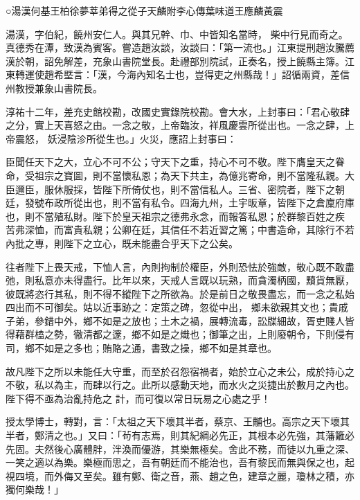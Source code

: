 
\begin{pinyinscope}

 ○湯漢何基王柏徐夢莘弟得之從子天麟附李心傳葉味道王應麟黃震



 湯漢，字伯紀，饒州安仁人。與其兄幹、巾、中皆知名當時，
 柴中行見而奇之。真德秀在潭，致漢為賓客。嘗造趙汝談，汝談曰：「第一流也。」江東提刑趙汝騰薦漢於朝，詔免解差，充象山書院堂長。赴禮部別院試，正奏名，授上饒縣主簿。江東轉運使趙希塈言：「漢，今海內知名士也，豈得吏之州縣哉！」詔循兩資，差信州教授兼象山書院長。



 淳祐十二年，差充史館校勘，改國史實錄院校勘。會大水，上封事曰：「君心敬肆之分，實上天喜怒之由。一念之敬，上帝臨汝，祥風慶雲所從出也。一念之肆，上帝震怒，
 妖浸陰沴所從生也。」火災，應詔上封事曰：



 臣聞任天下之大，立心不可不公；守天下之重，持心不可不敬。陛下膺皇天之眷命，受祖宗之寶圖，則不當懷私恩；為天下共主，為億兆寄命，則不當隆私親。大臣邇臣，服休服採，皆陛下所倚仗也，則不當信私人。三省、密院者，陛下之朝廷，發號布政所從出也，則不當有私令。四海九州，土宇昄章，皆陛下之倉廩府庫也，則不當殖私財。陛下於皇天祖宗之德弗永念，而報答私恩；於群黎百姓之疾
 苦弗深恤，而富貴私親；公卿在廷，其信任不若近習之篤；中書造命，其除行不若內批之專，則陛下之立心，既未能盡合乎天下之公矣。



 往者陛下上畏天戒，下恤人言，內則拘制於權臣，外則恐怯於強敵，敬心既不敢盡弛，則私意亦未得盡行。比年以來，天戒人言既以玩熟，而貪濁柄國，黷貨無厭，彼既將恣行其私，則不得不縱陛下之所欲為。於是前日之敬畏盡忘，而一念之私始四出而不可御矣。姑以近事跡之：定策之碑，忽從中出，
 鄉未欲親其文也；貴戚子弟，參錯中外，鄉不如是之放也；土木之禍，展轉流毒，訟牒細故，胥吏賤人皆得藉群榼之勢，徹清都之邃，鄉不如是之熾也；御筆之出，上則廢朝令，下則侵有司，鄉不如是之多也；賄賂之通，書致之操，鄉不如是其章也。



 故凡陛下之所以未能任大守重，而至於召怨宿禍者，始於立心之未公，成於持心之不敬，私以為主，而肆以行之。此所以感動天地，而水火之災捷出於數月之內也。陛下得不亟為治亂持危之
 計，而可復以常日玩易之心處之乎！



 授太學博士，轉對，言：「太祖之天下壞其半者，蔡京、王黼也。高宗之天下壞其半者，鄭清之也。」又曰：「茍有志焉，則其紀綱必先正，其根本必先強，其藩籬必先固。夫然後心廣體胖，泮渙而優游，其樂無極矣。舍此不務，而徒以九重之深、一笑之適以為樂。樂極而思之，吾有朝廷而不能治也，吾有黎民而無與保之也，起視四境，而外侮又至矣。雖有鄭、衛之音，燕、趙之色，建章之麗，瓊林之積，亦獨何樂哉！」




\end{pinyinscope}
